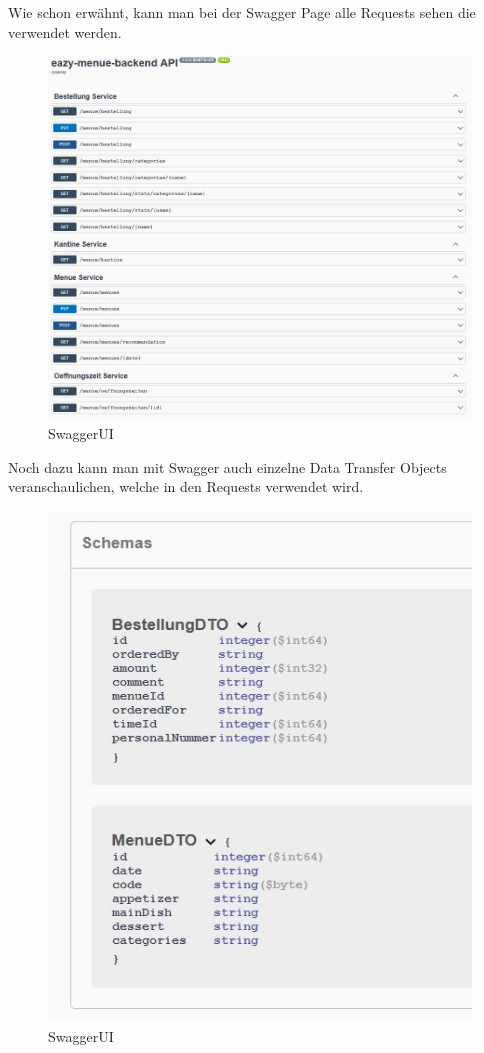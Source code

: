 Wie schon erwähnt, kann man bei der Swagger Page alle Requests sehen die verwendet werden. 

\begin{figure}[htp]
    \author{David Ignjatovic}
    \centering
    \includegraphics[scale=0.60]{pics/swagger.jpg}
    \caption{SwaggerUI}
    \label{fig:impl:swagger}
\end{figure}

Noch dazu kann man mit Swagger auch einzelne Data Transfer Objects veranschaulichen, welche in den Requests verwendet wird.

\begin{figure}[htp]
    \author{David Ignjatovic}
    \centering
    \includegraphics[scale=0.40]{pics/swagger-schema.jpg}
    \caption{SwaggerUI}
    \label{fig:impl:swagger-schema}
\end{figure}





